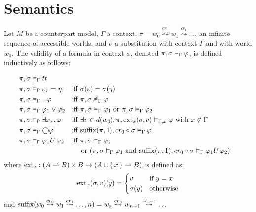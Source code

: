 \section{Semantics}

\begin{definition}\label{def:fosemantic}
Let $M$ be a counterpart model, $\Gamma$ a context, $\pi = w_0 \overset{cr_0}{\rightsquigarrow} w_1
\overset{cr_1}{\rightsquigarrow} \ldots$, an infinite sequence of accessible worlds, and $\sigma$ a substitution with
context $\Gamma$ and with world $w_0$.  The validity of a formula-in-context $\phi$, denoted
${\pi}, {\sigma} \vDash_{\Gamma} {\varphi}$, is defined inductively as follows:

\begin{align*}
  \pi, \sigma &\vDash_\Gamma tt \\
  \pi, \sigma &\vDash_\Gamma \varepsilon_\tau = \eta_\tau &&\text{iff } \sigma(\varepsilon) = \sigma(\eta) \\
  \pi, \sigma &\vDash_\Gamma \neg\varphi &&\text{iff } {\pi}, {\sigma} \nvDash_{\Gamma} {\varphi} \\
  \pi, \sigma &\vDash_\Gamma \varphi_1 \lor \varphi_2
      &&\text{iff } {\pi}, {\sigma} \vDash_{\Gamma} {\varphi_1} \text{ or } {\pi}, {\sigma} \vDash_{\Gamma} {\varphi_2} \\
  \pi, \sigma &\vDash_\Gamma \exists {x_\tau} \ldotp {\varphi}
      &&\text{iff } \exists {v \in d(w_0)} \ldotp {{\pi}, {\operatorname{ext}_x(\sigma, v)} \vDash_{\Gamma, x} {\varphi}}
        \text{ with } x \not\in \Gamma \\
  \pi, \sigma &\vDash_\Gamma \bigcirc{\varphi}
      &&\text{iff } {\operatorname{suffix}(\pi, 1)}, {cr_0 \circ \sigma} \vDash_{\Gamma} {\varphi} \\
  \pi, \sigma &\vDash_\Gamma {\varphi_1}U\,{\varphi_2}
      &&\text{iff } {\pi}, {\sigma} \vDash_{\Gamma} {\varphi_2} \\
      &&&\quad\text{ or } ({\pi}, {\sigma} \vDash_{\Gamma} {\varphi_1}
        \text { and } {\operatorname{suffix}(\pi, 1)}, {cr_0 \circ \sigma} \vDash_{\Gamma} {{\varphi_1}U\,{\varphi_2}})
\end{align*}
  where $\operatorname{ext}_x : (A \rightharpoonup B) \times B \to (A \cup \set{x} \rightharpoonup B)$ is defined as:
  \[
    \operatorname{ext}_x(\sigma, v)(y) = \begin{cases} v & \text{if } y = x \\ \sigma(y) & \text{otherwise}\end{cases}
  \]
  and $\operatorname{suffix}(w_0 \overset{cr_0}{\rightsquigarrow} w_1 \overset{cr_1}{\rightsquigarrow} \ldots, n) =
  w_n \overset{cr_n}{\rightsquigarrow} w_{n+1} \overset{cr_{n+1}}{\rightsquigarrow} \ldots$
\end{definition}

